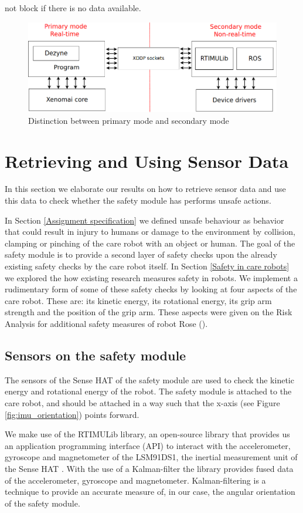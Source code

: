 \documentclass[12pt]{scrreprt}
\begin{document}
not block if there is no data available.

\begin{figure}[H]
    \centering
    \includegraphics[width=\textwidth]{Figures/results/communication_scheme.png}
    \caption{Distinction between primary mode and secondary mode}
    \label{fig:communication_scheme}
\end{figure}

\newpage
\section{Retrieving and Using Sensor Data}
\label{Retrieving and Using Sensor Data}
In this section we elaborate our results on how to retrieve sensor data and use this data to check whether the safety module has performs unsafe actions.
\par
In Section \ref{Assignment specification} we defined unsafe behaviour as behavior that could result in injury to humans or damage to the environment by collision, clamping or pinching of the care robot with an object or human. The goal of the safety module is to provide a second layer of safety checks upon the already existing safety checks by the care robot itself. In Section \ref{Safety in care robots} we explored the how existing research measures safety in robots. We implement a rudimentary form of some of these safety checks by looking at four aspects of the care robot. These are: its kinetic energy, its rotational energy, its grip arm strength and the position of the grip arm. These aspects were given on the Risk Analysis for additional safety measures of robot Rose (\cite{risk_analysis_additional}).

\subsection{Sensors on the safety module}
The sensors of the Sense HAT of the safety module are used to check the kinetic energy and rotational energy of the robot. The safety module is attached to the care robot, and should be attached in a way such that the x-axis (see Figure \ref{fig:imu_orientation}) points forward.
\par
We make use of the RTIMULib library, an open-source library that provides us an application programming interface (API) to interact with the accelerometer, gyroscope and magnetometer of the LSM91DS1, the inertial measurement unit of the Sense HAT \cite{rtimulib}. With the use of a Kalman-filter the library provides fused data of the accelerometer, gyroscope and magnetometer. Kalman-filtering is a technique to provide an accurate measure of, in our case, the angular orientation of the safety module.
\end{document}

